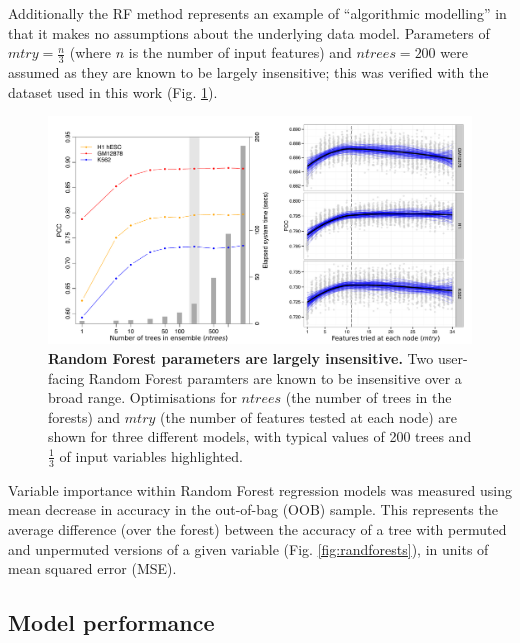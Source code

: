 \documentclass[a4paper,11pt,oneside]{book}
\begin{document}
Additionally the RF method represents an example of ``algorithmic
modelling''\cite{Breiman2001b} in that it makes no assumptions about the
underlying data model.
Parameters of $mtry = \frac{n}{3}$ (where $n$ is the number of input features) and $ntrees =
200$ were assumed as they are known to be
largely insensitive;\cite{Dasgupta2012, Hastie2001} this was verified
with the dataset used in this work (Fig. \ref{fig:rfparam}). 

\begin{figure}
\begin{center}
\includegraphics[width=5in]{figs/rfparams.pdf}
\captionsetup{width=\textwidth}
\caption[Random Forest parameters are largely insensitive.]{ {\bf Random Forest parameters are largely insensitive. } 
Two user-facing Random Forest paramters are known to be insensitive over a broad range.\cite{Hastie2001} Optimisations for $ntrees$ (the number of trees in the forests) and $mtry$ (the number of features tested at each node) are shown for three different models, with typical values of 200 trees and $\frac{1}{3}$ of input variables highlighted.
}\label{fig:rfparam}
\end{center}
\end{figure} 

Variable importance within Random Forest regression models was measured
using mean decrease in accuracy in the out-of-bag (OOB) sample. This
represents the average difference (over the forest) between the accuracy
of a tree with permuted and unpermuted versions of a given variable (Fig. \ref{fig:randforests}), in
units of mean squared error (MSE).\citep{Cutler2007, Dasgupta2012}

\subsection{Model performance}\label{sec:modelperf}
\end{document}

